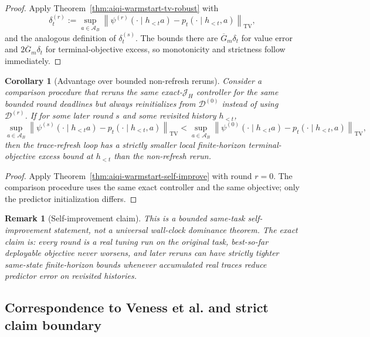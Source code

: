 \documentclass[11pt]{article}
\newtheorem{corollary}{Corollary}
\newtheorem{remark}{Remark}
\begin{document}
\begin{proof}
Apply Theorem~\ref{thm:aiqi-warmstart-tv-robust} with
\[
\delta_t^{(r)}:=
\sup_{a\in\mathcal{A}_B}
\left\|
\psi^{(r)}(\cdot\mid h_{<t}a)-p_t(\cdot\mid h_{<t},a)
\right\|_{\mathrm{TV}},
\]
and the analogous definition of $\delta_t^{(s)}$. The bounds there are
$\overline G_m\delta_t$ for value error and $2\overline G_m\delta_t$ for
terminal-objective excess, so monotonicity and strictness follow immediately.
\end{proof}

\begin{corollary}[Advantage over bounded non-refresh reruns]
\label{cor:aiqi-warmstart-self-improve-vs-restart}
Consider a comparison procedure that reruns the same exact-$\mathcal{J}_H$
controller for the same bounded round deadlines but always reinitializes from
$\mathcal{D}^{(0)}$ instead of using $\mathcal{D}^{(r)}$. If for some later
round $s$ and some revisited history $h_{<t}$,
\[
\sup_{a\in\mathcal{A}_B}
\left\|
\psi^{(s)}(\cdot\mid h_{<t}a)-p_t(\cdot\mid h_{<t},a)
\right\|_{\mathrm{TV}}
<
\sup_{a\in\mathcal{A}_B}
\left\|
\psi^{(0)}(\cdot\mid h_{<t}a)-p_t(\cdot\mid h_{<t},a)
\right\|_{\mathrm{TV}},
\]
then the trace-refresh loop has a strictly smaller local finite-horizon
terminal-objective excess bound at $h_{<t}$ than the non-refresh rerun.
\end{corollary}

\begin{proof}
Apply Theorem~\ref{thm:aiqi-warmstart-self-improve} with round $r=0$. The
comparison procedure uses the same exact controller and the same objective;
only the predictor initialization differs.
\end{proof}

\begin{remark}[Self-improvement claim]
This is a bounded same-task self-improvement statement, not a universal
wall-clock dominance theorem. The exact claim is: every round is a real tuning
run on the original task, best-so-far deployable objective never worsens, and
later reruns can have strictly tighter same-state finite-horizon bounds
whenever accumulated real traces reduce predictor error on revisited histories.
\end{remark}

\subsection{Correspondence to Veness et al. and strict claim boundary}
\end{document}
